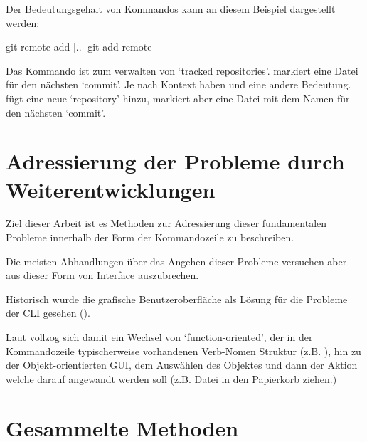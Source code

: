 \documentclass[oneside,bibliography=totocnumbered,BCOR=5mm]{scrbook}
\newenvironment{code}{\captionsetup{type=listing, skip=0pt}}{}
\begin{document}
Der Bedeutungsgehalt von Kommandos kann an diesem Beispiel dargestellt werden:

\begin{code}
  \begin{shellcode}
git remote add [..]
git add remote
  \end{shellcode}
  \medskip
\end{code}

Das Kommando  ist zum verwalten von `tracked repositories'.
 markiert eine Datei für den nächsten `commit'.
Je nach Kontext haben  und  eine andere Bedeutung.
 fügt eine neue `repository' hinzu,  markiert aber eine Datei mit dem Namen  für den
nächsten `commit'.

\section{Adressierung der Probleme durch Weiterentwicklungen}

Ziel dieser Arbeit ist es Methoden zur Adressierung dieser fundamentalen
Probleme innerhalb der Form der Kommandozeile zu beschreiben.

Die meisten Abhandlungen über das Angehen dieser Probleme versuchen aber aus
dieser Form von Interface auszubrechen.

Historisch wurde die grafische Benutzeroberfläche als Lösung für die Probleme der
CLI gesehen (\cite{Norman_2007}). %

Laut \cite{nielson1993} vollzog sich damit ein Wechsel von `function-oriented',
der in der Kommandozeile typischerweise vorhandenen Verb-Nomen Struktur (z.B.
), hin zu der Objekt-orientierten GUI, dem Auswählen des
Objektes und dann der Aktion welche darauf angewandt werden soll (z.B. Datei in
den Papierkorb ziehen.)





\section{Gesammelte Methoden}
\end{document}

